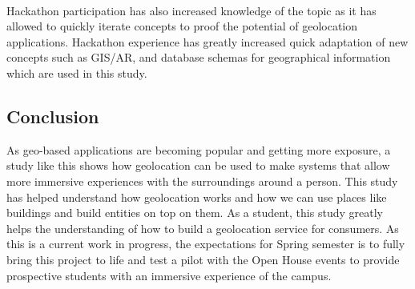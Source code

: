 \paragraph{} Hackathon participation has also increased knowledge of the topic as it has allowed to quickly iterate concepts to proof the potential of geolocation applications. Hackathon experience has greatly increased quick adaptation of new concepts such as GIS/AR, and database schemas for geographical information which are used in this study. 
 
\subsection{Conclusion}
As geo-based applications are becoming popular and getting more exposure, a study like this shows how geolocation can be used to make systems that allow more immersive experiences with the surroundings around a person. This study has helped understand how geolocation works and how we can use places like buildings and build entities on top on them. As a student, this study greatly helps the understanding of how to build a geolocation service for consumers. As this is a current work in progress, the expectations for Spring semester is to fully bring this project to life and test a pilot with the Open House events to provide prospective students with an immersive experience of the campus.
 

